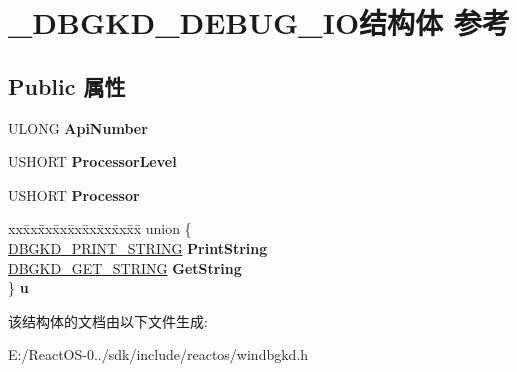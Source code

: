 \hypertarget{struct___d_b_g_k_d___d_e_b_u_g___i_o}{}\section{\+\_\+\+D\+B\+G\+K\+D\+\_\+\+D\+E\+B\+U\+G\+\_\+\+I\+O结构体 参考}
\label{struct___d_b_g_k_d___d_e_b_u_g___i_o}
\subsection*{Public 属性}
\begin{DoxyCompactItemize}
\item 
\mbox{\label{struct___d_b_g_k_d___d_e_b_u_g___i_o_a68715cf5583065fcce5b27d0b5a7626f}} 
U\+L\+O\+NG {\bfseries Api\+Number}
\item 
\mbox{\label{struct___d_b_g_k_d___d_e_b_u_g___i_o_a95ad1dcc3e293de7903b1c4f481254e5}} 
U\+S\+H\+O\+RT {\bfseries Processor\+Level}
\item 
\mbox{\label{struct___d_b_g_k_d___d_e_b_u_g___i_o_a90ebefe6ddfe86402272ac269d260d7b}} 
U\+S\+H\+O\+RT {\bfseries Processor}
\item 
\mbox{\label{struct___d_b_g_k_d___d_e_b_u_g___i_o_a0098228d576bc7b1047f5edeb9a4240b}} 
\begin{tabbing}
xx\=xx\=xx\=xx\=xx\=xx\=xx\=xx\=xx\=\kill
union \{\\
\>\hyperlink{struct___d_b_g_k_d___p_r_i_n_t___s_t_r_i_n_g}{DBGKD\_PRINT\_STRING} {\bfseries PrintString}\\
\>\hyperlink{struct___d_b_g_k_d___g_e_t___s_t_r_i_n_g}{DBGKD\_GET\_STRING} {\bfseries GetString}\\
\} {\bfseries u}\\

\end{tabbing}\end{DoxyCompactItemize}


该结构体的文档由以下文件生成\+:\begin{DoxyCompactItemize}
\item 
E\+:/\+React\+O\+S-\/0../sdk/include/reactos/windbgkd.\+h\end{DoxyCompactItemize}
